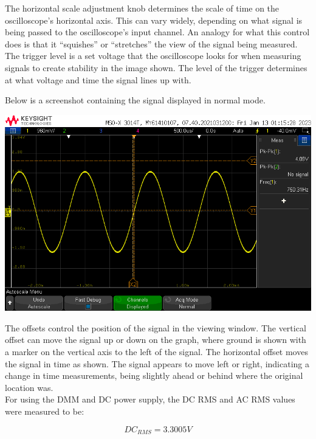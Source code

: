 \documentclass[notitlepage, 12pt]{report}  %
\begin{document}
The horizontal scale adjustment knob determines the scale of time on the oscilloscope's horizontal axis. 
This can vary widely, depending on what signal is being passed to the oscilloscope's input channel. 
An analogy for what this control does is that it ``squishes'' or ``stretches'' the view of the signal being measured. \\

The trigger level is a set voltage that the oscilloscope looks for when measuring signals to create stability in the
image shown. The level of the trigger determines at what voltage and time the signal lines up with.\\

\newpage

Below is a screenshot containing the signal displayed in normal mode.

\begin{center}
    \includegraphics[scale=0.5]{scope1.png}
\end{center}


The offsets control the position of the signal in the viewing window. The vertical offset can move the signal up 
or down on the graph, where ground is shown with a marker on the vertical axis to the left of the signal. The
horizontal offset moves the signal in time as shown. The signal appears to move left or right, indicating a 
change in time measurements, being slightly ahead or behind where the original location was. \\

For using the DMM and DC power supply, the DC RMS and AC RMS values were measured to be:

\begin{equation}
    DC_{RMS} = 3.3005V
\end{equation}
\end{document}
